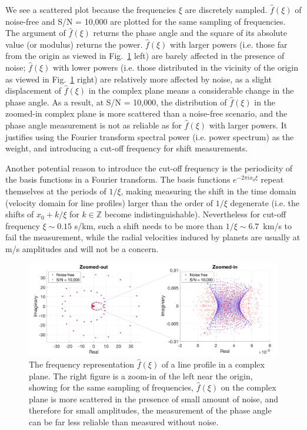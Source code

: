 We see a scattered plot because the frequencies $\xi$ are discretely sampled. $\hat{f}(\xi)$ of noise-free and S/N = 10,000 are plotted for the same sampling of frequencies. The argument of $\hat{f}(\xi)$ returns the phase angle and the square of its absolute value (or modulus) returns the power. $\hat{f}(\xi)$ with larger powers (i.e. those far from the origin as viewed in Fig.~\ref{fig:FT_compelx_plane} left) are barely affected in the presence of noise; $\hat{f}(\xi)$ with lower powers (i.e. those distributed in the vicinity of the origin as viewed in Fig.~\ref{fig:FT_compelx_plane} right) are relatively more affected by noise, as a slight displacement of $\hat{f}(\xi)$ in the complex plane means a considerable change in the phase angle. As a result, at S/N = 10,000, the distribution of $\hat{f}(\xi)$ in the zoomed-in complex plane is more scattered than a noise-free scenario, and the phase angle measurement is not as reliable as for $\hat{f}(\xi)$ with larger powers. It justifies using the Fourier transform spectral power (i.e. power spectrum) as the weight, and introducing a cut-off frequency for shift measurements. 

Another potential reason to introduce the cut-off frequency is the periodicity of the basis functions in a Fourier transform. The basis functions $e^{-2 \pi ix_0 \xi}$ repeat themselves at the periods of $1/\xi$, making measuring the shift in the time domain (velocity domain for line profiles) larger than the order of $1/\xi$ degenerate (i.e. the shifts of $x_0+k/\xi$ for $k\in\mathbb{Z}$ become indistinguishable). Nevertheless for cut-off frequency $\xi \sim 0.15$ s/km, such a shift needs to be more than $1/\xi\sim6.7$~km/s to fail the measurement, while the radial velocities induced by planets are usually at m/s amplitudes and will not be a concern.

\begin{figure}[tbp]
\centering
\includegraphics[width = 0.99 \linewidth]
{./Figures/Methods/7-complex_plane.png}
\caption[The frequency representation $\hat{f}(\xi)$ of a line profile in a complex plane]
{The frequency representation $\hat{f}(\xi)$ of a line profile in a complex plane. The right figure is a zoom-in of the left near the origin, showing for the same sampling of frequencies, $\hat{f}(\xi)$ on the complex plane is more scattered in the presence of small amount of noise, and therefore for small amplitudes, the measurement of the phase angle can be far less reliable than measured without noise.}
\label{fig:FT_compelx_plane}
\end{figure} 

